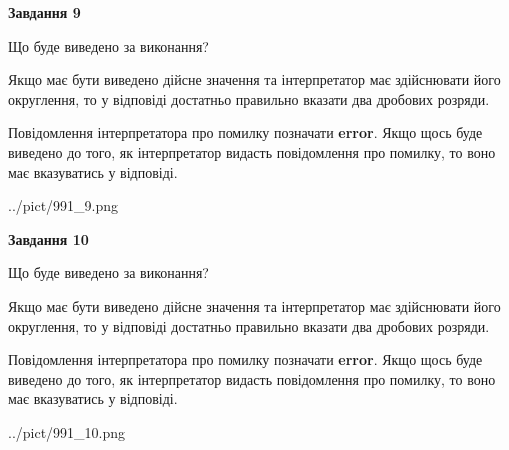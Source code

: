 \documentclass[12pt, ukrainian]{article}
\begin{document}
{\begin {Large}
{\begin {center}\textbf{Завдання 9}\end {center}}\par
Що буде виведено за виконання? \par

Якщо має бути виведено дійсне значення та інтерпретатор має здійснювати його округлення, 
то у відповіді достатньо правильно вказати два дробових розряди.

Повідомлення інтерпретатора про помилку позначати \textbf{error}.
Якщо щось буде виведено до того, як інтерпретатор видасть повідомлення про помилку, 
то воно має вказуватись у відповіді. \par

\begin{center}
	{../pict/991_9.png}
\end{center}
\newpage

{\begin {center}\textbf{Завдання 10}\end {center}}\par
Що буде виведено за виконання? \par

Якщо має бути виведено дійсне значення та інтерпретатор має здійснювати його округлення, 
то у відповіді достатньо правильно вказати два дробових розряди.

Повідомлення інтерпретатора про помилку позначати \textbf{error}.
Якщо щось буде виведено до того, як інтерпретатор видасть повідомлення про помилку, 
то воно має вказуватись у відповіді. \par

\begin{center}
	{../pict/991_10.png}
\end{center}
\newpage

\end {Large}}
\end{document}
